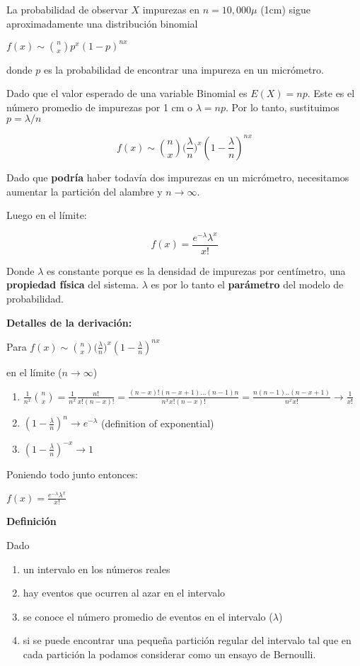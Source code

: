 \documentclass[
]{book}
\providecommand{\tightlist}{%
  \setlength{\itemsep}{0pt}\setlength{\parskip}{0pt}}
\begin{document}
La probabilidad de observar \(X\) impurezas en \(n=10,000\mu\) (1cm) sigue aproximadamente una distribución binomial

\(f(x) \sim \binom nxp^x(1-p)^{nx}\)

donde \(p\) es la probabilidad de encontrar una impureza en un micrómetro.

Dado que el valor esperado de una variable Binomial es \(E(X)=np\). Este es el número promedio de impurezas por 1 cm o \(\lambda=np\). Por lo tanto, sustituimos \(p=\lambda/n\)

\[f(x) \sim \binom nx \big(\frac{\lambda}{n}\big)^x(1-\frac{\lambda}{n})^{nx}\]

Dado que \textbf{podría} haber todavía dos impurezas en un micrómetro, necesitamos aumentar la partición del alambre y \(n \rightarrow \infty\).

Luego en el límite:

\[f(x)= \frac{e^{-\lambda}\lambda^x}{x!}\]

Donde \(\lambda\) es constante porque es la densidad de impurezas por centímetro, una \textbf{propiedad física} del sistema. \(\lambda\) es por lo tanto el \textbf{parámetro} del modelo de probabilidad.

\textbf{Detalles de la derivación:}

Para \(f(x) \sim \binom nx \big(\frac{\lambda}{n}\big)^x(1-\frac{\lambda}{n})^{nx}\)

en el límite (\(n \rightarrow \infty\))

\begin{enumerate}
\def\labelenumi{\arabic{enumi})}
\tightlist
\item
  \(\frac{1}{n^x}\binom n x =\frac{1}{n^x}\frac{n!}{x! (n-x)!}=\frac{(n-x)!(n-x+1)...(n-1)n}{n^x x! (n-x)!}=\frac{n(n-1)..(n-x+1)}{n^x x!} \rightarrow \frac{1}{x!}\)
\item
  \((1-\frac{\lambda}{n})^{n} \rightarrow e^{-\lambda}\) (definition of exponential)
\item
  \((1-\frac{\lambda}{n})^{-x} \rightarrow 1\)
\end{enumerate}

Poniendo todo junto entonces:

\(f(x)= \frac{e^{-\lambda}\lambda^x}{x!}\)

\textbf{Definición}

Dado

\begin{enumerate}
\def\labelenumi{\arabic{enumi})}
\tightlist
\item
  un intervalo en los números reales
\item
  hay eventos que ocurren al azar en el intervalo
\item
  se conoce el número promedio de eventos en el intervalo (\(\lambda\))
\item
  si se puede encontrar una pequeña partición regular del intervalo tal que en cada partición la podamos considerar como un ensayo de Bernoulli.
\end{enumerate}
\end{document}
